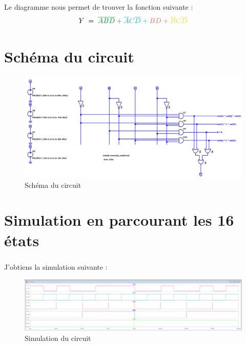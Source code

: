     \subparagraph{}Le diagramme nous permet de trouver la fonction suivante : 
         \begin{equation*}
            Y\;=\;\color{mygreen}\overline{A}\overline{B}\overline{D} + \color{cyan} \overline{A}C\overline{D} + 
            \color{kred} BD + \color{kyellow}\overline{B}C\overline{D}
         \end{equation*}

\section{Schéma du circuit}

    \begin{figure}[H]
        \centering
        \includegraphics[width=\textwidth]{../pictures/circuit.PNG}
        \caption{Schéma du circuit}
        \label{fig:circuit}
    \end{figure}
    
    
\section{Simulation en parcourant les 16 états}

    \subparagraph{}J'obtiens la simulation suivante :
        
        \begin{figure}[H]
            \centering
            \includegraphics[width=\textwidth]{../pictures/simu.PNG}
            \caption{Simulation du circuit}
            \label{fig:simu}
        \end{figure}
    

